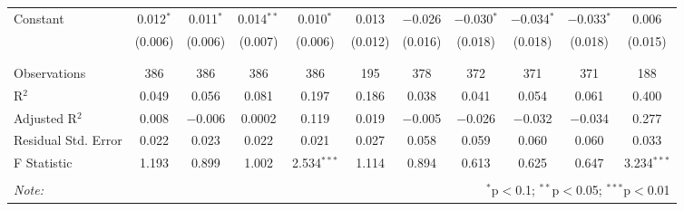 \begin{table}[H]
\begin{tabular}{@{\extracolsep{4pt}}lcccccccccc}
 Constant & 0.012$^{*}$ & 0.011$^{*}$ & 0.014$^{**}$ & 0.010$^{*}$ & 0.013 & $-$0.026 & $-$0.030$^{*}$ & $-$0.034$^{*}$ & $-$0.033$^{*}$ & 0.006 \\ 
  & (0.006) & (0.006) & (0.007) & (0.006) & (0.012) & (0.016) & (0.018) & (0.018) & (0.018) & (0.015) \\ 
  & & & & & & & & & & \\ 
\hline \\[-1.8ex] 
Observations & 386 & 386 & 386 & 386 & 195 & 378 & 372 & 371 & 371 & 188 \\ 
R$^{2}$ & 0.049 & 0.056 & 0.081 & 0.197 & 0.186 & 0.038 & 0.041 & 0.054 & 0.061 & 0.400 \\ 
Adjusted R$^{2}$ & 0.008 & $-$0.006 & 0.0002 & 0.119 & 0.019 & $-$0.005 & $-$0.026 & $-$0.032 & $-$0.034 & 0.277 \\ 
Residual Std. Error & 0.022 & 0.023 & 0.022 & 0.021 & 0.027 & 0.058 & 0.059 & 0.060 & 0.060 & 0.033 \\ 
F Statistic & 1.193 & 0.899 & 1.002 & 2.534$^{***}$ & 1.114 & 0.894 & 0.613 & 0.625 & 0.647 & 3.234$^{***}$ \\ 
\hline 
\hline \\[-1.8ex] 
\textit{Note:}  & \multicolumn{10}{r}{$^{*}$p$<$0.1; $^{**}$p$<$0.05; $^{***}$p$<$0.01} \\ 
\end{tabular} 
\end{table} 
